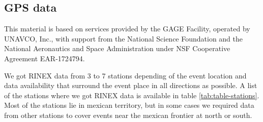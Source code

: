  
\subsection{GPS data}
\label{ssec:GPS}
This material is based on services provided by the GAGE Facility, operated by UNAVCO, Inc., with support from the National Science Foundation and the National Aeronautics and Space Administration under NSF Cooperative Agreement EAR-1724794.

We got RINEX data from 3 to 7 stations depending of the event location and data availability that surround the event place in all directions as possible. A list of the stations where we got RINEX data is available in table \ref{tab:table-stations}. Most of the stations lie in mexican territory, but in some cases we required data from other stations to cover events near the mexican frontier at north or south.

